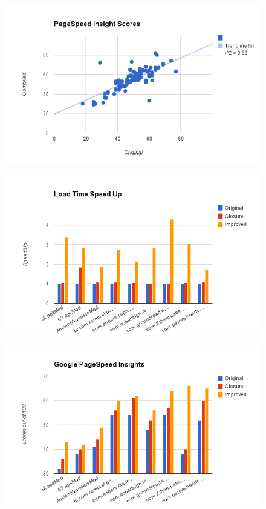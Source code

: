 \documentclass{acm_proc_article-sp}
\begin{document}
\begin{figure}[h!]
    \includegraphics[scale=0.4]{pagespeedrq1}
\end{figure}

\begin{figure}[h!]
    \includegraphics[scale=0.4]{loadtime}
\end{figure}

\begin{figure}[h!]
    \includegraphics[scale=0.4]{pagespeeds}
\end{figure}
\end{document}
